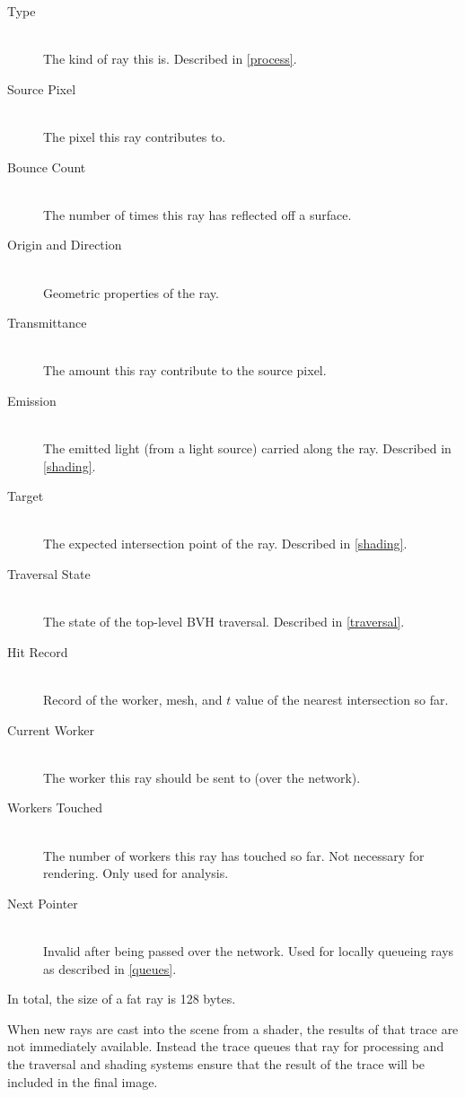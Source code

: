 \documentclass[12pt]{ucthesis}
\begin{document}
\begin{description}
    \item[Type] \hfill \\
        The kind of ray this is. Described in \ref{process}.
    \item[Source Pixel] \hfill \\
        The pixel this ray contributes to.
    \item[Bounce Count] \hfill \\
        The number of times this ray has reflected off a surface.
    \item[Origin and Direction] \hfill \\
        Geometric properties of the ray.
    \item[Transmittance] \hfill \\
        The amount this ray contribute to the source pixel.
    \item[Emission] \hfill \\
        The emitted light (from a light source) carried along the ray.
        Described in \ref{shading}.
    \item[Target] \hfill \\
        The expected intersection point of the ray. Described in \ref{shading}.
    \item[Traversal State] \hfill \\
        The state of the top-level BVH traversal. Described in \ref{traversal}.
    \item[Hit Record] \hfill \\
        Record of the worker, mesh, and $t$ value of the nearest intersection
        so far.
    \item[Current Worker] \hfill \\
        The worker this ray should be sent to (over the network).
    \item[Workers Touched] \hfill \\
        The number of workers this ray has touched so far. Not necessary for
        rendering. Only used for analysis.
    \item[Next Pointer] \hfill \\
        Invalid after being passed over the network. Used for locally queueing
        rays as described in \ref{queues}.
\end{description}

In total, the size of a fat ray is 128 bytes.

When new rays are cast into the scene from a shader, the results of that trace
are not immediately available. Instead the trace queues that ray for processing
and the traversal and shading systems ensure that the result of the trace will be
included in the final image.
\end{document}
